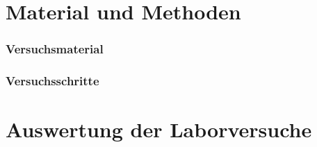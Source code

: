 \documentclass[12pt,UTF8]{article}
\begin{document}
\part{Material und Methoden}
\section{Versuchsmaterial}

\newpage
\section{Versuchsschritte}

\newpage

\part{Auswertung der Laborversuche}
\end{document}
